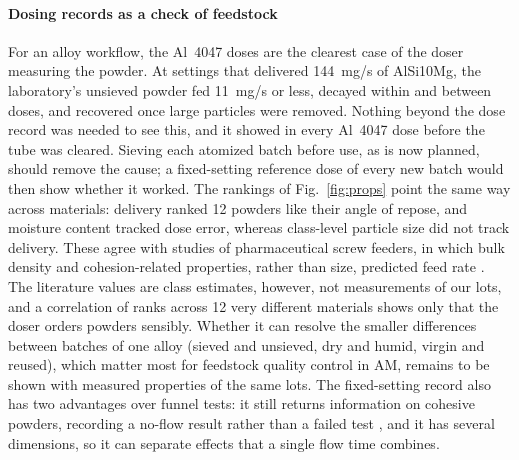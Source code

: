 \documentclass[preprint,12pt]{elsarticle}
\begin{document}
\paragraph{Dosing records as a check of feedstock} For an alloy workflow, the Al~4047 doses are the clearest case of the doser measuring the powder. At settings that delivered 144~mg/s of AlSi10Mg, the laboratory's unsieved powder fed 11~mg/s or less, decayed within and between doses, and recovered once large particles were removed. Nothing beyond the dose record was needed to see this, and it showed in every Al~4047 dose before the tube was cleared. Sieving each atomized batch before use, as is now planned, should remove the cause; a fixed-setting reference dose of every new batch would then show whether it worked. The rankings of Fig.~\ref{fig:props} point the same way across materials: delivery ranked 12 powders like their angle of repose, and moisture content tracked dose error, whereas class-level particle size did not track delivery. These agree with studies of pharmaceutical screw feeders, in which bulk density and cohesion-related properties, rather than size, predicted feed rate \cite{Wang2017Predicting,Tahir2020Development,Bekaert2021Determination,Bostijn2019Twin}. The literature values are class estimates, however, not measurements of our lots, and a correlation of ranks across 12 very different materials shows only that the doser orders powders sensibly. Whether it can resolve the smaller differences between batches of one alloy (sieved and unsieved, dry and humid, virgin and reused), which matter most for feedstock quality control in AM, remains to be shown with measured properties of the same lots. The fixed-setting record also has two advantages over funnel tests: it still returns information on cohesive powders, recording a no-flow result rather than a failed test \cite{Spierings2016Powder,Marchetti2021Powder}, and it has several dimensions, so it can separate effects that a single flow time combines.
\end{document}
